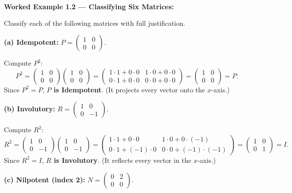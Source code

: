 \documentclass[12pt,a4paper]{article}
\begin{document}
\textbf{Worked Example 1.2 --- Classifying Six Matrices:}

Classify each of the following matrices with full justification.

\medskip
\textbf{(a) Idempotent:} $P = \begin{pmatrix} 1 & 0 \\ 0 & 0 \end{pmatrix}$.

Compute $P^2$:
\[
P^2 = \begin{pmatrix} 1 & 0 \\ 0 & 0 \end{pmatrix}\begin{pmatrix} 1 & 0 \\ 0 & 0 \end{pmatrix} = \begin{pmatrix} 1\cdot1+0\cdot0 & 1\cdot0+0\cdot0 \\ 0\cdot1+0\cdot0 & 0\cdot0+0\cdot0 \end{pmatrix} = \begin{pmatrix} 1 & 0 \\ 0 & 0 \end{pmatrix} = P.
\]
Since $P^2 = P$, \textbf{$P$ is Idempotent}. (It projects every vector onto the $x$-axis.)

\medskip
\textbf{(b) Involutory:} $R = \begin{pmatrix} 1 & 0 \\ 0 & -1 \end{pmatrix}$.

Compute $R^2$:
\[
R^2 = \begin{pmatrix} 1 & 0 \\ 0 & -1 \end{pmatrix}\begin{pmatrix} 1 & 0 \\ 0 & -1 \end{pmatrix} = \begin{pmatrix} 1\cdot1+0\cdot0 & 1\cdot0+0\cdot(-1) \\ 0\cdot1+(-1)\cdot0 & 0\cdot0+(-1)\cdot(-1) \end{pmatrix} = \begin{pmatrix} 1 & 0 \\ 0 & 1 \end{pmatrix} = I.
\]
Since $R^2 = I$, \textbf{$R$ is Involutory}. (It reflects every vector in the $x$-axis.)

\medskip
\textbf{(c) Nilpotent (index 2):} $N = \begin{pmatrix} 0 & 2 \\ 0 & 0 \end{pmatrix}$.
\end{document}
